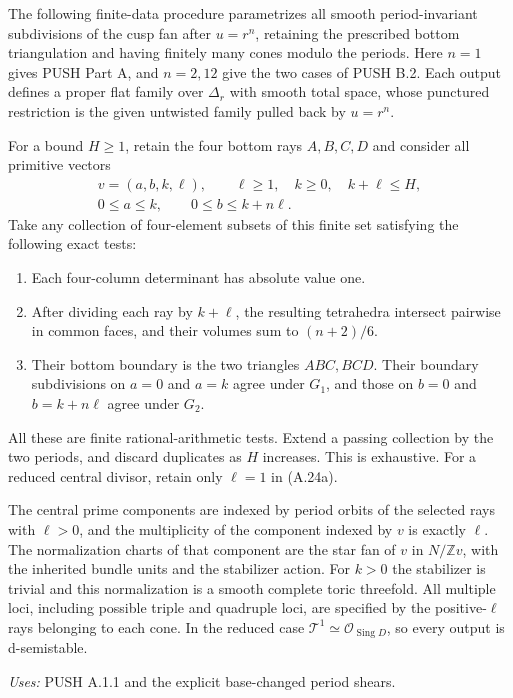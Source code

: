 \begin{announcement}[PUSH A.2.4; A]\label{push:A.2.4}
The following finite-data procedure parametrizes all smooth
period-invariant subdivisions of the cusp fan after
$u=r^n$, retaining the prescribed bottom triangulation and
having finitely many cones modulo the periods. Here $n=1$
gives PUSH Part A, and $n=2,12$ give the two cases of PUSH B.2.
Each output defines a proper flat family over $\Delta_r$
with smooth total space, whose punctured restriction is the
given untwisted family pulled back by $u=r^n$.

For a bound $H\geq1$, retain the four bottom rays
$A,B,C,D$ and consider all primitive vectors
\[
 \begin{gathered}
 v=(a,b,k,\ell),\qquad
 \ell\geq1,\quad k\geq0,\quad k+\ell\leq H,\\
 0\leq a\leq k,\qquad0\leq b\leq k+n\ell.
 \end{gathered}
 \tag{A.24a}
\]
Take any collection of four-element subsets of this finite
set satisfying the following exact tests:
\begin{enumerate}
\item Each four-column determinant has absolute value one.
\item After dividing each ray by $k+\ell$, the resulting
tetrahedra intersect pairwise in common faces, and their
volumes sum to $(n+2)/6$.
\item Their bottom boundary is the two triangles $ABC,BCD$.
Their boundary subdivisions on $a=0$ and $a=k$ agree under
$G_1$, and those on $b=0$ and $b=k+n\ell$ agree under $G_2$.
\end{enumerate}
All these are finite rational-arithmetic tests. Extend a
passing collection by the two periods, and discard duplicates
as $H$ increases. This is exhaustive. For a reduced central
divisor, retain only $\ell=1$ in (A.24a).

The central prime components are indexed by period orbits of
the selected rays with $\ell>0$, and the multiplicity of the
component indexed by $v$ is exactly $\ell$. The normalization
charts of that component are the star fan of $v$ in
$N/\mathbb Zv$, with the inherited bundle units and the
stabilizer action. For $k>0$ the stabilizer is trivial and this
normalization is a smooth complete toric threefold. All
multiple loci, including possible triple and quadruple loci,
are specified by the positive-$\ell$ rays belonging to each
cone. In the reduced case
$\mathcal T^1\simeq\mathcal O_{\operatorname{Sing}D}$,
so every output is d-semistable.
\end{announcement}
\noindent\emph{Uses:} PUSH A.1.1 and the explicit base-changed period shears.\par

